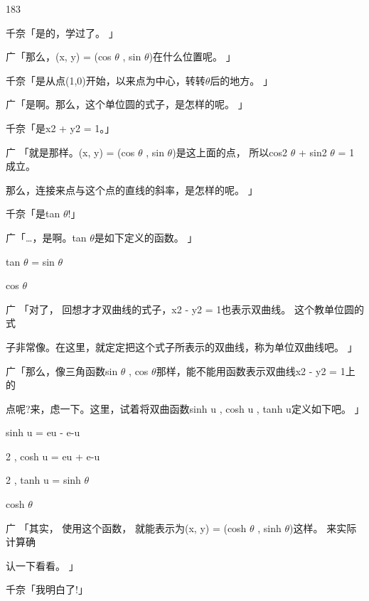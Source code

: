 183\par
千奈「是的，学过了。 」\par
广「那么，(x, y) = (cos $\theta$ , sin $\theta$)在什么位置呢。 」\par
千奈「是从点(1,0)开始，以来点为中心，转转$\theta$后的地方。 」\par
广「是啊。那么，这个单位圆的式子，是怎样的呢。 」\par
千奈「是x2 + y2 = 1。」\par
广 「就是那样。(x, y) = (cos $\theta$ , sin $\theta$)是这上面的点， 所以cos2 $\theta$ + sin2 $\theta$ = 1成立。\par
那么，连接来点与这个点的直线的斜率，是怎样的呢。 」\par
千奈「是tan $\theta$!」\par
广「…，是啊。tan $\theta$是如下定义的函数。 」\par
tan $\theta$ = sin $\theta$\par
cos $\theta$\par
广 「对了， 回想才才双曲线的式子，x2 - y2 = 1也表示双曲线。 这个教单位圆的式\par
子非常像。在这里，就定定把这个式子所表示的双曲线，称为单位双曲线吧。 」\par
广「那么，像三角函数sin $\theta$ , cos $\theta$那样，能不能用函数表示双曲线x2 - y2 = 1上的\par
点呢?来，虑一下。这里，试着将双曲函数sinh u , cosh u , tanh u定义如下吧。 」\par
sinh u = eu - e-u\par
2 , cosh u = eu + e-u\par
2 , tanh u = sinh $\theta$\par
cosh $\theta$\par
广 「其实， 使用这个函数， 就能表示为(x, y) = (cosh $\theta$ , sinh $\theta$)这样。 来实际计算确\par
认一下看看。 」\par
千奈「我明白了!」\par

